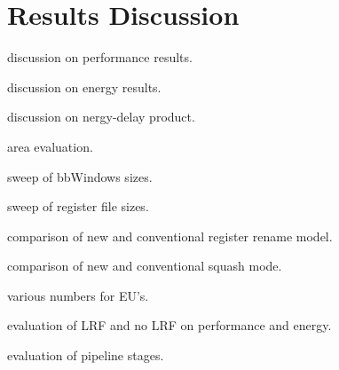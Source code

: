 \section{Results Discussion}
\label{sec:discussion}

discussion on performance results.

discussion on energy results.

discussion on nergy-delay product.

area evaluation.

sweep of bbWindows sizes.

sweep of register file sizes.

comparison of new and conventional register rename model.

comparison of new and conventional squash mode.

various numbers for EU's.

evaluation of LRF and no LRF on performance and energy.

evaluation of pipeline stages.
